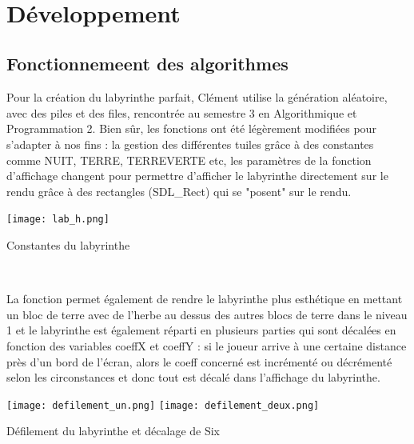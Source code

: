 \documentclass[10pt]{article}
\begin{document}
\begin{center}
\begin{center}
\label{fig4}\\
\end{center}

\clearpage
\section{Développement}
   \subsection{Fonctionnemeent des algorithmes}
   Pour la création du \gls{labyrinthe} parfait, Clément utilise la génération aléatoire, avec des \gls{piles} et des \gls{files}, rencontrée au semestre 3 en Algorithmique et Programmation 2.
   Bien sûr, les fonctions ont été légèrement modifiées pour s'adapter à nos fins : la gestion des différentes tuiles grâce à des \gls{constantes} comme NUIT, TERRE, TERREVERTE etc, les paramètres de la fonction d'affichage changent pour permettre d'afficher le labyrinthe directement sur le \gls{rendu}  grâce à des rectangles (SDL\_Rect) qui se "posent" sur le rendu. 
   \\
    \begin{center}
        \centering
        \texttt{[image: lab\_h.png]}
        \caption{Constantes du labyrinthe}
        \label{fig4}\\
    \end{center}
   La fonction permet également de rendre le labyrinthe plus esthétique en mettant un bloc de terre avec de l'herbe au dessus des autres blocs de terre dans le niveau 1 et le labyrinthe est également réparti en plusieurs parties qui sont décalées en fonction des variables coeffX et coeffY : si le joueur arrive à une certaine distance près d'un bord de l'écran, alors le coeff concerné est incrémenté ou décrémenté selon les circonstances et donc tout est décalé dans l'affichage du labyrinthe.\\
   \begin{center}
        \centering
        \texttt{[image: defilement\_un.png]}
        \texttt{[image: defilement\_deux.png]}
        \caption{Défilement du labyrinthe et décalage de Six}
        \label{fig4}\\
    \end{center}
   
   
   

\end{center}
\end{document}
